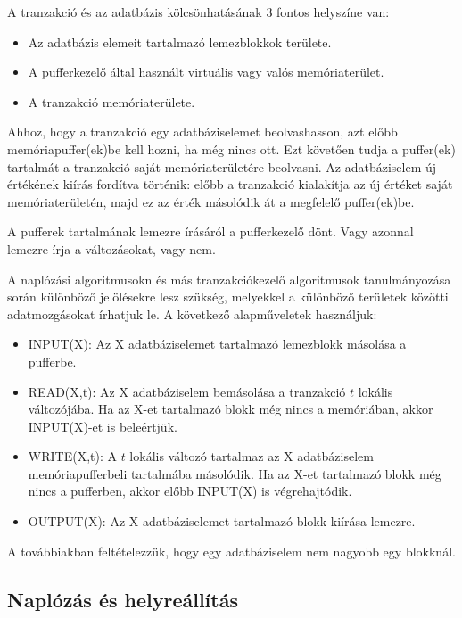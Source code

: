 \documentclass[margin=0px]{article}
\begin{document}
\noindent A tranzakció és az adatbázis kölcsönhatásának 3 fontos helyszíne van:
\begin{itemize}
    \item	Az adatbázis elemeit tartalmazó lemezblokkok területe.
    \item	A pufferkezelő által használt virtuális vagy valós memóriaterület.
    \item	A tranzakció memóriaterülete.
\end{itemize}

Ahhoz, hogy a tranzakció egy adatbáziselemet beolvashasson, azt előbb memóriapuffer(ek)be kell hozni, ha még nincs ott.
Ezt követően tudja a puffer(ek) tartalmát a tranzakció saját memóriaterületére beolvasni. Az adatbáziselem új
értékének kiírás fordítva történik: előbb a tranzakció kialakítja az új értéket saját memóriaterületén, majd ez
az érték másolódik át a megfelelő puffer(ek)be.

A pufferek tartalmának lemezre írásáról a pufferkezelő dönt. Vagy azonnal lemezre írja a változásokat, vagy nem.

A naplózási algoritmusokn és más tranzakciókezelő algoritmusok tanulmányozása során különböző jelölésekre lesz szükség,
melyekkel a különböző területek közötti adatmozgásokat írhatjuk le. A következő alapműveletek használjuk:

\begin{itemize}
    \item	INPUT(X): Az X adatbáziselemet tartalmazó lemezblokk másolása a pufferbe.
    \item	READ(X,t): Az X adatbáziselem bemásolása a tranzakció $t$ lokális változójába. Ha az X-et tartalmazó blokk még
          nincs a memóriában, akkor INPUT(X)-et is beleértjük.
    \item	WRITE(X,t): A $t$ lokális változó tartalmaz az X adatbáziselem memóriapufferbeli tartalmába másolódik. Ha az X-et
          tartalmazó blokk még nincs a pufferben, akkor előbb INPUT(X) is végrehajtódik.
    \item	OUTPUT(X): Az X adatbáziselemet tartalmazó blokk kiírása lemezre.
\end{itemize}

\noindent A továbbiakban feltételezzük, hogy egy adatbáziselem nem nagyobb egy blokknál.

\subsection{Naplózás és helyreállítás}
\end{document}
